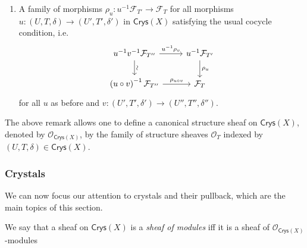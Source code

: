 \documentclass[../Main]{subfiles}
\begin{document}
\begin{rem}
\begin{enumerate}
		\item A family of morphisms $\rho_u\colon u^{-1}\mathcal{F}_{T'} \to \mathcal{F}_T$
			for all morphisms $u\colon \left(U, T, \delta\right) \to 
			\left(U', T', \delta'\right)$ in $\mathsf{Crys}(X)$
			satisfying the usual cocycle condition, i.e.
			\begin{equation*}
			\begin{tikzcd}
				u^{-1} v^{-1} \mathcal{F}_{T''} 
				\arrow[r, "u^{-1}\rho_v", rightarrow] 
				\arrow[d, "\rotatebox{90}{\(\sim\)}", rightarrow] &
				u^{-1} \mathcal{F}_{T'} 
				\arrow[d, "\rho_u", rightarrow] \\
				\left( u \circ v \right)^{-1} \mathcal{F}_{T''}
				\arrow[r, "\rho_{u \circ v}", rightarrow] &
				\mathcal{F}_T
			\end{tikzcd}
			\end{equation*}
			for all $u$ as before and $v\colon \left(U', T', \delta'\right) \to 
			\left(U'', T'', \delta''\right)$.
	\end{enumerate}
\end{rem}


\begin{ex}
	The above remark allows one to define a canonical structure sheaf
	on $\mathsf{Crys}(X)$, denoted by $\mathcal{O}_{\mathsf{Crys}(X)}$,
	by the family of structure sheaves $\mathcal{O}_T$
	indexed by $\left(U, T, \delta\right) \in \mathsf{Crys}(X)$.
\end{ex}



\subsubsection{Crystals}
We can now focus our attention to crystals and their pullback, which are the main
topics of this section.


\begin{defn}
	We say that a sheaf on $\mathsf{Crys}(X)$ is a {\em sheaf of modules}
	iff it is a sheaf of $\mathcal{O}_{\mathsf{Crys}(X)}$-modules
\end{defn}
\end{document}
